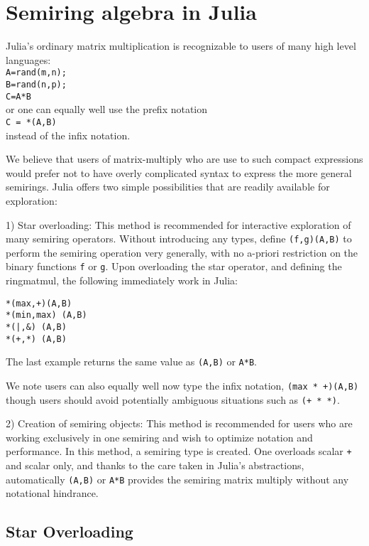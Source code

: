 \documentclass[conference]{IEEEtran}
\begin{document}
\section{Semiring algebra in Julia}

Julia's ordinary matrix multiplication is recognizable to users of many
high level languages: \\
{\tt A=rand(m,n); \\  B=rand(n,p); \\ C=A*B } \\ 
or one can equally well use the prefix notation \\
{\tt C = *(A,B)} \\ 
instead of the infix notation.

We believe that users of matrix-multiply who are use 
to such compact expressions would prefer not to have 
overly complicated syntax to express the more general 
semirings.  Julia offers two simple possibilities that are readily
available for exploration: 

1) Star overloading:
This method is recommended for interactive exploration of many semiring operators. 
Without introducing any types, define  {\tt *(f,g)(A,B)} to 
perform the semiring operation very generally, with no a-priori restriction
on the binary functions {\tt f} or {\tt g}.   Upon overloading the star operator,
and defining the ringmatmul, the following immediately work in Julia:
\begin{verbatim}
*(max,+)(A,B)  
*(min,max) (A,B)  
*(|,&) (A,B)  
*(+,*) (A,B)
\end{verbatim}  
The last example returns the same value as {\tt *(A,B)} or {\tt A*B}.

We note users can also equally well now type the infix notation,
{\tt (max * +)(A,B) } though users should avoid potentially ambiguous situations such as
{\tt (+ * *)}.

2) Creation of semiring objects:  This method is recommended for users who are working exclusively in one semiring and wish to optimize notation and performance.  In this method,
a semiring type is created.  One overloads scalar {\tt +} and scalar {\tt *} only,
and thanks to the care taken in Julia's abstractions,  automatically 
{\tt *(A,B)} or {\tt A*B} provides the semiring matrix multiply without any notational
hindrance.
   
\subsection{Star Overloading}
\end{document}
